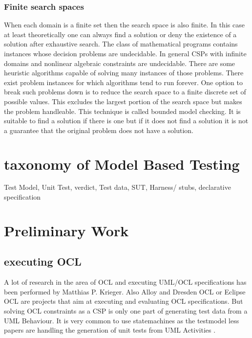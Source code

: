 \subsubsection{Finite search spaces}
When each domain is a finite set then the search space is also finite. In this case at least theoretically one can always find a solution or deny the existence of a solution after exhaustive search. 
The class of mathematical programs contains instances whose decision problems are undecidable.
In general CSPs with infinite domains and nonlinear algebraic constraints are undecidable. There are some heuristic algorithms capable of solving many instances of those problems. There exist problem instances for which algorithms tend to run forever. One option to break such problems down is to reduce the search space to a finite discrete set of possible values. This excludes the largest portion of the search space but makes the problem handleable. This technique is called bounded model checking. It is suitable to find a solution if there is one but if it does not find a solution it is not a guarantee that the original problem does not have a solution.




\section{taxonomy of Model Based Testing}
Test Model,
Unit Test,
verdict,
Test data,
SUT,
Harness/ stubs,
declarative specification

\section{Preliminary Work}
\subsection{executing OCL}
A lot of research in the area of OCL and executing UML/OCL specifications has been performed by Matthias P. Krieger\cite{krieger2008executing}. Also Alloy and Dresden OCL or Eclipse OCL are projects that aim at executing and evaluating OCL specifications. But solving OCL constraints as a CSP is only one part of generating test data from a UML Behaviour.
It is very common to use statemachines as the testmodel less papers are handling the generation of unit tests from UML Activities\cite{Linzhang04GeneratingTestCasefromActivityGrayBoxMethod}
\cite{Patel12TestCaseFormationUsigUMLActivityDiagram}
\cite{Pechtanun12GeneratingTestCaseFromUMLActivityDiagramBasedOnACGrammar}
\cite{Xu09ModelCheckingUMLActivities}\cite{Xu09ModelCheckingUMLActivityDiagramsFDR}. 


